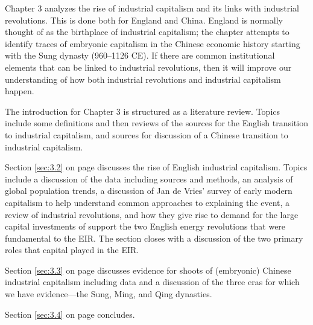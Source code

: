 	Chapter 3 analyzes the rise of industrial capitalism and its links with industrial revolutions. This is done both for England and China. England is normally thought of as the birthplace of industrial capitalism; the chapter attempts to identify traces of embryonic capitalism in the Chinese economic history starting with the Sung dynasty (960--1126 CE). If there are common institutional elements that can be linked to industrial revolutions, then it will improve our understanding of how both industrial revolutions and industrial capitalism happen.
	
	The introduction for Chapter 3 is structured as a literature review. Topics include some definitions and then reviews of the sources for the English transition to industrial capitalism, and sources for discussion of a Chinese transition to industrial capitalism.
	
	Section \ref{sec:3.2} on page \pageref{sec:3.2} discusses the rise of English industrial capitalism. Topics include a discussion of the data including sources and methods, an analysis of global population trends, a discussion of Jan de Vries' survey of early modern capitalism to help understand common approaches to explaining the event, a review of industrial revolutions, and how they give rise to demand for the large capital investments of support the two English energy revolutions that were fundamental to the EIR. The section closes with a discussion of the two primary roles that capital played in the EIR.
	
	Section \ref{sec:3.3} on page \pageref{sec:3.3} discusses evidence for shoots of (embryonic) Chinese industrial capitalism including data and a discussion of the three eras for which we have evidence---the Sung, Ming, and Qing dynasties.
	
	Section \ref{sec:3.4} on page \pageref{sec:3.4} concludes.
